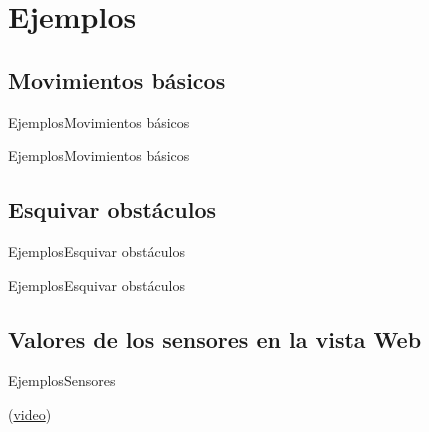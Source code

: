 \documentclass{beamer}
\begin{document}
\section{Ejemplos}
\subsection{Movimientos básicos}
\begin{frame}{Ejemplos}{Movimientos básicos}
    \begin{minipage}{0.45\linewidth}
        
    \end{minipage}\hspace{0.1\linewidth}%
    \begin{minipage}{0.45\linewidth}
        
    \end{minipage}
\end{frame}

\begin{frame}[fragile]{Ejemplos}{Movimientos básicos}
    
\end{frame}

\subsection{Esquivar obstáculos}
\begin{frame}{Ejemplos}{Esquivar obstáculos}
    \begin{minipage}{0.45\linewidth}
        
    \end{minipage}\hspace{0.1\linewidth}%
    \begin{minipage}{0.45\linewidth}
        
    \end{minipage}
\end{frame}

\begin{frame}[fragile]{Ejemplos}{Esquivar obstáculos}
    
\end{frame}

\subsection{Valores de los sensores en la vista Web}
\begin{frame}[fragile]{Ejemplos}{Sensores}
    
    (\href{run:ejemplos/senses.mp4}{video})
\end{frame}
\end{document}
